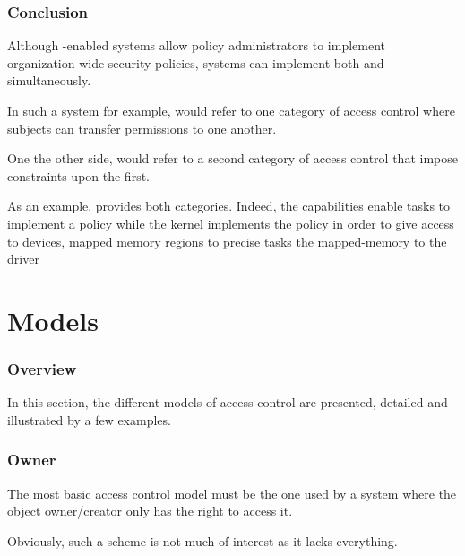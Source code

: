 \begin{frame}
  \frametitle{Conclusion}

  Although -enabled systems allow policy administrators to
  implement organization-wide security policies, systems can implement both
   and  simultaneously.

  \-

  In such a system for example,  would refer to one category of
  access control where subjects can transfer permissions to one another.

  \-

  One the other side,  would refer to a second category of access
  control that impose constraints upon the first.

  \-

  As an example,  provides both categories. Indeed, the
  capabilities enable tasks to implement a  policy while the kernel
  implements the  policy in order to give access to devices, mapped
  memory regions \etc{} to precise tasks \eg{} the  mapped-memory to
  the  driver \etc{}
\end{frame}

%
%

\section{Models}


\begin{frame}
  \frametitle{Overview}

  In this section, the different models of access control are presented,
  detailed and illustrated by a few examples.
\end{frame}


\begin{frame}
  \frametitle{Owner}

  The most basic access control model must be the one used by a system where
  the object owner/creator only has the right to access it.

  \-

  Obviously, such a scheme is not much of interest as it lacks everything.
\end{frame}



